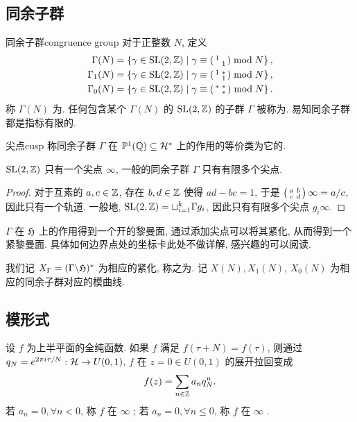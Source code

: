 \subsection{同余子群}

\begin{definition}{同余子群}{congruence group}
对于正整数 $N$, 定义
  \[\begin{split}
  \Gamma(N)&=\left\{\gamma\in{\mathrm{SL}}(2,{\mathbb{Z}})\mid \gamma\equiv\left(\begin{smallmatrix}1 &  \\  & 1\end{smallmatrix}\right)\bmod N\right\},\\
  \Gamma_1(N)&=\left\{\gamma\in{\mathrm{SL}}(2,{\mathbb{Z}})\mid \gamma\equiv\left(\begin{smallmatrix}1 & * \\  & 1\end{smallmatrix}\right)\bmod N\right\},\\
  \Gamma_0(N)&=\left\{\gamma\in{\mathrm{SL}}(2,{\mathbb{Z}})\mid \gamma\equiv\left(\begin{smallmatrix}* & * \\  & *\end{smallmatrix}\right)\bmod N\right\}.
  \end{split}\]
称 $\Gamma(N)$ 为.
任何包含某个 $\Gamma(N)$ 的 ${\mathrm{SL}}(2,{\mathbb{Z}})$ 的子群 $\Gamma$ 被称为. 易知同余子群都是指标有限的.
\end{definition}

\begin{definition}{尖点}{cusp}
称同余子群 $\Gamma$ 在 ${\mathbb{P}}^1({\mathbb{Q}})\subseteq {\mathcal{H}}^*$ 上的作用的等价类为它的.
\end{definition}

\begin{proposition}{}{}
${\mathrm{SL}}(2,{\mathbb{Z}})$ 只有一个尖点 $\infty$, 一般的同余子群 $\Gamma$ 只有有限多个尖点.
\end{proposition}
\begin{proof}
对于互素的 $a,c\in{\mathbb{Z}}$, 存在 $b,d\in{\mathbb{Z}}$ 使得 $ad-bc=1$, 于是 $\left(\begin{smallmatrix}a & b \\ c & d\end{smallmatrix}\right)\infty=a/c$, 因此只有一个轨道. 一般地, ${\mathrm{SL}}(2,{\mathbb{Z}})=\sqcup_{i=1}^k \Gamma g_i$, 因此只有有限多个尖点 $g_i\infty$.
\end{proof}

$\Gamma$ 在 ${\mathfrak{H}}$ 上的作用得到一个开的黎曼面, 通过添加尖点可以将其紧化, 从而得到一个紧黎曼面. 具体如何边界点处的坐标卡此处不做详解, 感兴趣的可以阅读\cite{Li2020}.

我们记 $X_\Gamma=(\Gamma\backslash{\mathfrak{H}})^*$ 为相应的紧化, 称之为. 记 $X(N),X_1(N)$, $X_0(N)$ 为相应的同余子群对应的模曲线.


\subsection{模形式}
设 $f$ 为上半平面的全纯函数. 如果 $f$ 满足 $f(\tau+N)=f(\tau)$, 则通过 $q_N=e^{2\pi i\tau/N}: {\mathcal{H}}\rightarrow U(0,1)$, $f$ 在 $z=0\in U(0,1)$ 的展开拉回变成
  \[f(z)=\sum_{n\in{\mathbb{Z}}} a_n q^n_N.\] 
若 $a_n=0,\forall n<0$, 称 $f$ 在 $\infty$ ;
若 $a_n=0,\forall n\le 0$, 称 $f$ 在 $\infty$ .

